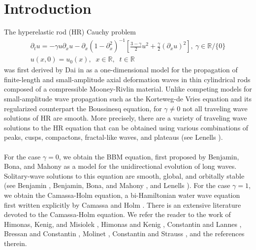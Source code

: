 \documentclass[12pt,reqno]{amsart}
\numberwithin{equation}{section}  %
\numberwithin{figure}{section}
\newcommand{\rr}{\mathbb{R}}
\newcommand{\p}{\partial}
\begin{document}
\section{Introduction}
%
%
%
The hyperelastic rod (HR) Cauchy problem
\begin{gather}
\p_t u =  -\gamma u \p_x u -
\p_{x} (1 - \p_{x}^{2})^{-1} \left[ \frac{3-\gamma}{2}u^2 +
\frac{\gamma}{2} \left( \p_x u \right)^2
\right], \ \gamma \in \rr \slash \{0\}
\label{hyperelastic-rod-equation}
\\
u(x,0) = u_0(x), \; \; x \in \rr, \; \; t \in \rr
\label{init-cond}
\end{gather}
%
%
was first
derived by Dai in \cite{Dai_1998_Model-equations} as a one-dimensional 
model for the propagation of finite-length and
small-amplitude axial deformation waves in thin cylindrical
rods composed of a compressible Mooney-Rivlin
material. Unlike competing models for small-amplitude wave propagation such as
the Korteweg-de Vries equation and its regularized counterpart the Boussinesq equation, for $\gamma \neq 0$ not all traveling wave solutions of HR are smooth. More precisely, there are a variety of traveling wave solutions to the HR equation that
can be obtained using various combinations of peaks, cusps, compactons,
fractal-like waves, and plateaus (see Lenells 
\cite{Lenells_2006_Traveling-waves}). 
\\
\\
For the case $\gamma = 0$, we obtain the 
BBM equation, first proposed by 
Benjamin, Bona, and Mahony 
\cite{Benjamin_1972_Model-equations} as a model for 
the unidirectional evolution of long waves.
Solitary-wave solutions to this 
equation are smooth, global, and orbitally stable (see Benjamin 
\cite{Benjamin_1972_The-stability-o}, Benjamin, Bona, and Mahony
\cite{Benjamin_1972_Model-equations}, and Lenells
\cite{Lenells_2006_Traveling-waves}). For the case $\gamma =1$, we obtain the Camassa-Holm equation, a bi-Hamiltonian
water wave equation first written explicitly by Camassa and Holm
\cite{Camassa-Holm-1993-An-integrable-shallow-water}. There is an extensive
literature devoted to the Camassa-Holm equation. We refer the reader to the work
of Himonas, Kenig, and Misiolek \cite{Himonas:2010p1187}, Himonas and Kenig
\cite{Himonas:2009fk}, Constantin and Lannes
\cite{Constantin-Lannes-2009-The-hydrodynamical-relevance-of-the-Camassa-Holm},
Bressan and Constantin \cite{Bressan_2007_Global-conserva}, 
Molinet \cite{Molinet_2004_On-well-posedne}, Constantin and Strauss
\cite{Constantin_2000_Stability-of-pe}, and the references therein.
\end{document}
